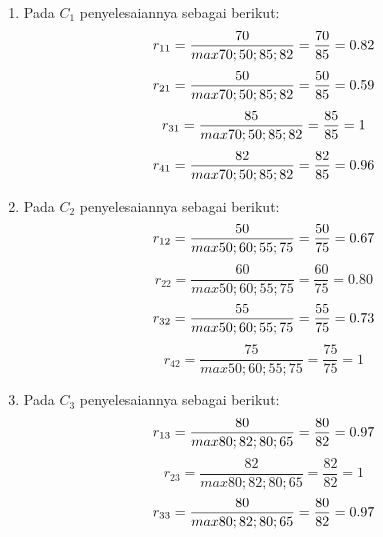 \documentclass[a4paper,twoside]{article}
\begin{document}
\begin{enumerate}
\begin{enumerate}
	\item Pada $C_{1}$ penyelesaiannya sebagai berikut:
\begin{displaymath}
r_{11} = \frac{70}{max {70;50;85;82}} = \frac{70}{85} = 0.82\\
\end {displaymath}
\begin{displaymath}
r_{21} = \frac{50}{max {70;50;85;82}} = \frac{50}{85} = 0.59\\
\end{displaymath}
\begin{displaymath}
r_{31} = \frac{85}{max {70;50;85;82}} = \frac{85}{85} = 1\\
\end {displaymath}
\begin{displaymath}
r_{41} = \frac{82}{max {70;50;85;82}} = \frac{82}{85} = 0.96\\
\end {displaymath}
\item Pada $C_{2}$ penyelesaiannya sebagai berikut:
\begin{displaymath}
r_{12} = \frac{50}{max {50;60;55;75}} = \frac{50}{75} = 0.67\\
\end{displaymath}
\begin{displaymath}
r_{22} = \frac{60}{max {50;60;55;75}} = \frac{60}{75} = 0.80
\end{displaymath}
\begin{displaymath}
r_{32} = \frac{55}{max {50;60;55;75}} = \frac{55}{75} = 0.73\\
\end{displaymath}
\begin{displaymath}
r_{42} = \frac{75}{max {50;60;55;75}} = \frac{75}{75} = 1
\end{displaymath}
\item Pada $C_{3}$ penyelesaiannya sebagai berikut:
\begin{displaymath}
r_{13} = \frac{80}{max {80;82;80;65}} = \frac{80}{82} = 0.97\\
\end{displaymath}
\begin{displaymath}
r_{23} = \frac{82}{max {80;82;80;65}} = \frac{82}{82} = 1
\end{displaymath}
\begin{displaymath}
r_{33} = \frac{80}{max {80;82;80;65}} = \frac{80}{82} = 0.97\\
\end{displaymath}

\end{enumerate}
\end{enumerate}
\end{document}
